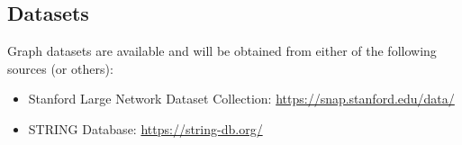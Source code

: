 \documentclass[12pt,a4paper,twoside]{article}
\begin{document}
    \subsection*{Datasets}
    
    Graph datasets are available and will be obtained from either of the following sources (or others):
    
    \begin{itemize}
        \item Stanford Large Network Dataset Collection: \url{https://snap.stanford.edu/data/}
        \item STRING Database: \url{https://string-db.org/}
    \end{itemize}
\end{document}
